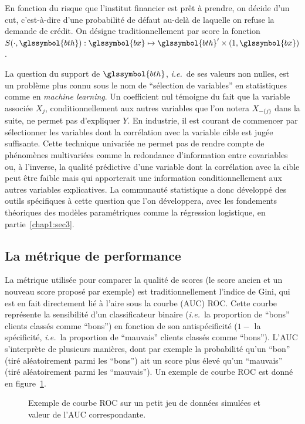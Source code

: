 En fonction du risque que l'institut financier est prêt à prendre, on décide d'un \gls{cut}, c'est-à-dire d'une probabilité de défaut au-delà de laquelle on refuse la demande de crédit. On désigne traditionnellement par \gls{score} la fonction $S(\cdot,\glssymbol{bth}): \glssymbol{bx} \mapsto \glssymbol{bth}' \times (1,\glssymbol{bx})$.

La question du support  de $\glssymbol{bth}$, \textit{i.e.}\ de ses valeurs non nulles, est un problème plus connu sous le nom de ``sélection de variables'' en statistiques comme en \textit{machine learning}. Un coefficient nul témoigne du fait que la variable associée $X_j$, conditionnellement aux autres variables que l'on notera $X_{-\{j\}}$ dans la suite, ne permet pas d'expliquer $Y$. En industrie, il est courant de commencer par sélectionner les variables dont la corrélation avec la variable cible est jugée suffisante. Cette technique univariée ne permet pas de rendre compte de phénomènes multivariées comme la redondance d'information entre covariables ou, à l'inverse, la qualité prédictive d'une variable dont la corrélation avec la cible peut être faible mais qui apporterait une information conditionnellement aux autres variables explicatives. La communauté statistique a donc développé des outils spécifiques à cette question que l'on développera, avec les fondements théoriques des modèles paramétriques comme la régression logistique, en partie~\ref{chap1:sec3}.

\subsection{La métrique de performance}

La métrique utilisée pour comparer la qualité de \glspl{score} (le score ancien et un nouveau score proposé par exemple) est traditionnellement l'indice de Gini, qui est en fait directement lié à l'aire sous la courbe (AUC) ROC. Cette courbe représente la sensibilité d'un classificateur binaire (\textit{i.e.}\ la proportion de ``bons'' clients classés comme ``bons'') en fonction de son antispécificité ($1-$ la spécificité, \textit{i.e.}\ la proportion de ``mauvais'' clients classés comme ``bons''). L'AUC s'interprète de plusieurs manières, dont par exemple la probabilité qu'un ``bon'' (tiré aléatoirement parmi les ``bons'') ait un score plus élevé qu'un ``mauvais'' (tiré aléatoirement parmi les ``mauvais''). Un exemple de courbe ROC est donné en figure~\ref{fig:ROC}.

\begin{figure}
\centering \scalebox{.8}{}
\caption{\label{fig:ROC} Exemple de courbe ROC sur un petit jeu de données simulées et valeur de l'AUC correspondante.}
\end{figure}

